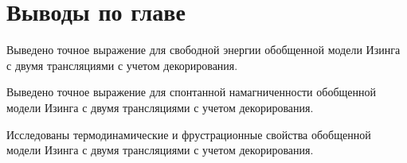 \section{Выводы по главе}

Выведено точное выражение для свободной энергии обобщенной модели Изинга с двумя трансляциями с учетом декорирования.

Выведено точное выражение для спонтанной намагниченности обобщенной модели Изинга с двумя трансляциями с учетом декорирования.

Исследованы термодинамические и фрустрационные свойства обобщенной модели Изинга с двумя трансляциями с учетом декорирования.

\FloatBarrier